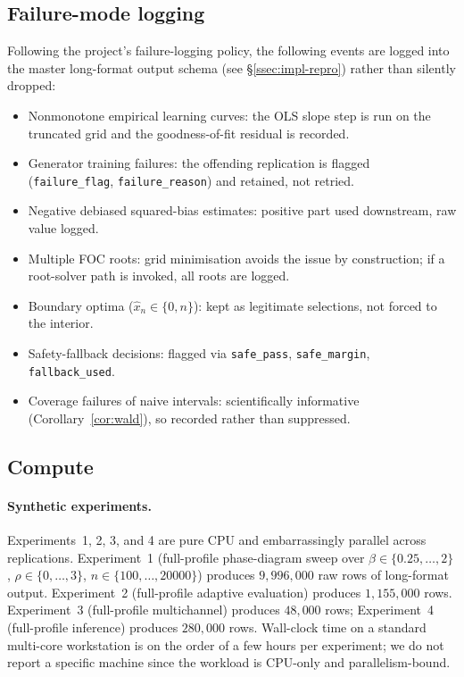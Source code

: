 \subsection{Failure-mode logging}\label{ssec:impl-failures}

Following the project's failure-logging policy, the following events are logged into the master long-format output schema (see \S\ref{ssec:impl-repro}) rather than silently dropped:
\begin{itemize}[leftmargin=*]
\item Nonmonotone empirical learning curves: the OLS slope step is run on the truncated grid and the goodness-of-fit residual is recorded.
\item Generator training failures: the offending replication is flagged (\texttt{failure\_flag}, \texttt{failure\_reason}) and retained, not retried.
\item Negative debiased squared-bias estimates: positive part used downstream, raw value logged.
\item Multiple FOC roots: grid minimisation avoids the issue by construction; if a root-solver path is invoked, all roots are logged.
\item Boundary optima ($\hat x_n\in\{0,n\}$): kept as legitimate selections, not forced to the interior.
\item Safety-fallback decisions: flagged via \texttt{safe\_pass}, \texttt{safe\_margin}, \texttt{fallback\_used}.
\item Coverage failures of naive intervals: scientifically informative (Corollary~\ref{cor:wald}), so recorded rather than suppressed.
\end{itemize}

\subsection{Compute}\label{ssec:impl-compute}

\paragraph{Synthetic experiments.} Experiments~1, 2, 3, and 4 are pure CPU and embarrassingly parallel across replications. Experiment~1 (full-profile phase-diagram sweep over $\beta\in\{0.25,\dots,2\}$, $\rho\in\{0,\dots,3\}$, $n\in\{100,\dots,20000\}$) produces $9{,}996{,}000$ raw rows of long-format output. Experiment~2 (full-profile adaptive evaluation) produces $1{,}155{,}000$ rows. Experiment~3 (full-profile multichannel) produces $48{,}000$ rows; Experiment~4 (full-profile inference) produces $280{,}000$ rows. Wall-clock time on a standard multi-core workstation is on the order of a few hours per experiment; we do not report a specific machine since the workload is CPU-only and parallelism-bound.

